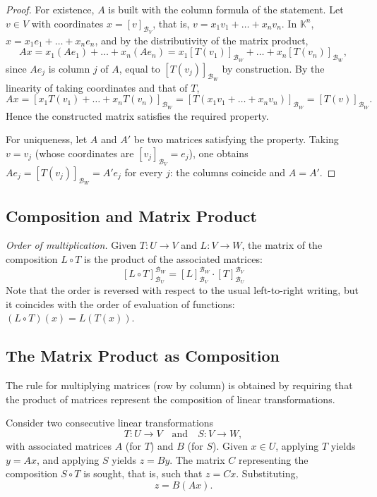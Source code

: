\documentclass[11pt, a4paper]{article}
\begin{document}
\begin{proof}
For existence, $A$ is built with the column formula of the statement. Let $v \in V$ with coordinates $x = [v]_{\mathcal{B}_V}$, that is, $v = x_1 v_1 + \dots + x_n v_n$. In $\mathbb{K}^n$, $x = x_1 e_1 + \dots + x_n e_n$, and by the distributivity of the matrix product,
\[ A x = x_1 (A e_1) + \dots + x_n (A e_n) = x_1 [T(v_1)]_{\mathcal{B}_W} + \dots + x_n [T(v_n)]_{\mathcal{B}_W}, \]
since $A e_j$ is column $j$ of $A$, equal to $[T(v_j)]_{\mathcal{B}_W}$ by construction. By the linearity of taking coordinates and that of $T$,
\[ A x = \left[ x_1 T(v_1) + \dots + x_n T(v_n) \right]_{\mathcal{B}_W} = \left[ T( x_1 v_1 + \dots + x_n v_n ) \right]_{\mathcal{B}_W} = [T(v)]_{\mathcal{B}_W}. \]
Hence the constructed matrix satisfies the required property.

For uniqueness, let $A$ and $A'$ be two matrices satisfying the property. Taking $v = v_j$ (whose coordinates are $[v_j]_{\mathcal{B}_V} = e_j$), one obtains $A e_j = [T(v_j)]_{\mathcal{B}_W} = A' e_j$ for every $j$: the columns coincide and $A = A'$.
\end{proof}

\subsection{Composition and Matrix Product}

\obs \textit{Order of multiplication.} Given $T: U \to V$ and $L: V \to W$, the matrix of the composition $L \circ T$ is the product of the associated matrices:
\[ [L \circ T]_{\mathcal{B}_U}^{\mathcal{B}_W} = [L]_{\mathcal{B}_V}^{\mathcal{B}_W} \cdot [T]_{\mathcal{B}_U}^{\mathcal{B}_V} \]
Note that the order is reversed with respect to the usual left-to-right writing, but it coincides with the order of evaluation of functions: $(L \circ T)(x) = L(T(x))$.

\subsection{The Matrix Product as Composition}

The rule for multiplying matrices (row by column) is obtained by requiring that the product of matrices represent the composition of linear transformations.

Consider two consecutive linear transformations
\[ T: U \to V \quad \text{and} \quad S: V \to W, \]
with associated matrices $A$ (for $T$) and $B$ (for $S$). Given $x \in U$, applying $T$ yields $y = Ax$, and applying $S$ yields $z = By$. The matrix $C$ representing the composition $S \circ T$ is sought, that is, such that $z = Cx$. Substituting,
\[ z = B(Ax). \]
\end{document}
